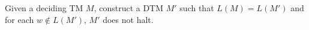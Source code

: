 Given a deciding TM $M$, construct a DTM $M'$ such that
$L(M) = L(M')$ and for each $w \notin L(M')$, $M'$ does not halt.
